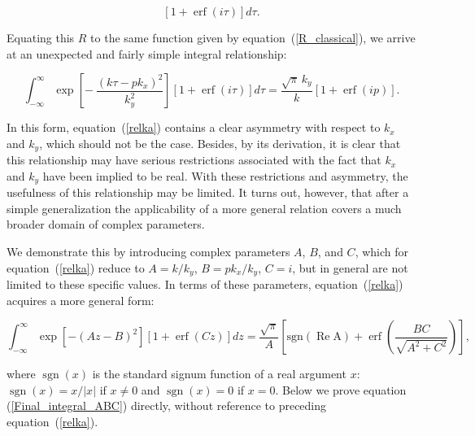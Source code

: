 \documentclass[draft]{agujournal2019}
\begin{document}
{\begin{linenomath*}
\begin{equation}
\left[  1+\operatorname{erf}\left(  i\tau\right)  \right]  d\tau. 
\label{RR=}
\end{equation}
\end{linenomath*}
Equating this $R$ to the same function given by equation~(\ref{R_classical}),
we arrive at an unexpected and fairly simple integral relationship:
\begin{linenomath*}
\begin{equation}
\int_{-\infty}^{\infty}\exp\left[  -\ \frac{\left(  k\tau-pk_{x}\right)
^{2}}{k_{y}^{2}}\right]  \left[  1+\operatorname{erf}\left(  i\tau\right)
\right]  d\tau=\frac{\sqrt{\pi}\,k_y}{k}[1+\operatorname{erf}\left(  ip\right)]  . 
\label{relka}
\end{equation}
\end{linenomath*}
In this form, equation~(\ref{relka}) contains a clear asymmetry with respect
to $k_{x}$ and $k_{y}$, which should not be the case. Besides, by its
derivation, it is clear that this relationship may have serious restrictions
associated with the fact that $k_{x}$ and $k_{y}$ have been implied to be real. With these
restrictions and asymmetry, the usefulness of this relationship may be
limited. It turns out, however, that after a simple generalization the 
applicability of a more general relation covers a much broader
domain of complex parameters.

We demonstrate this by introducing complex parameters $A$, $B$, and $C$, which
for equation~(\ref{relka}) reduce to $A=k/k_{y}$, $B=pk_{x}/k_{y}$, $C=i$, but
in general are not limited to these specific values. In terms of these
parameters, equation~(\ref{relka}) acquires a more general form:
\begin{linenomath*}
\begin{equation}
\int_{-\infty}^{\infty}\exp\left[  -\left(  Az-B\right)  ^{2}\right]  \left[
1+\operatorname{erf}\left(  Cz\right)  \right]  dz=\frac{\sqrt{\pi}}{A}\left[
\operatorname{sgn(\operatorname{Re}A)}+\operatorname{erf}\left(  \frac{BC}{\sqrt{A^{2}+C^{2}}}\right)  \right]  ,
\label{Final_integral_ABC}
\end{equation}
\end{linenomath*}
where $\operatorname{sgn}(x)$ is the standard signum function of a real argument $x$: 
$\operatorname{sgn}(x) = x/|x|$ if $x\neq 0$ and $\operatorname{sgn}(x)=0$ if $x=0$.
Below we prove equation (\ref{Final_integral_ABC}) directly, without reference to preceding
equation~(\ref{relka}).

}
\end{document}
